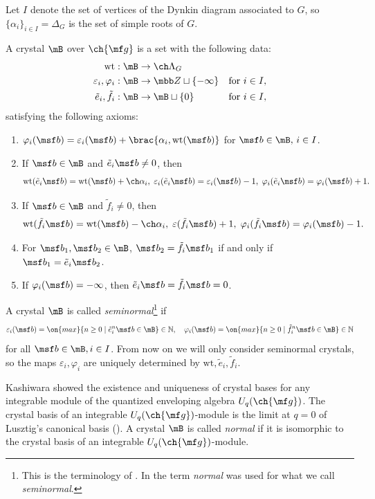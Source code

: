 Let $I$ denote the set of vertices of the Dynkin diagram associated to $G$,
so $\{\alpha_i\}_{i\in I} = \Delta_G$ is the set of simple roots of $G$.

A crystal $\mB$ over $\ch{\mf g}$ is a set with the following data:
\begin{align*}
\mathrm{wt} &: \mB \to \ch\Lambda_G \\
\varepsilon_i, \varphi_i &: \mB \to \mbb Z \sqcup \{ -\infty \} &\text{for } i\in I, \\
\tilde e_i, \tilde f_i &: \mB \to \mB \sqcup \{0\} &\text{for } i\in I,
\end{align*}
satisfying the following axioms:
\begin{enumerate}[label={(\arabic*)}]
\item $\varphi_i(\msf b) = \varepsilon_i(\msf b) + \brac{ \alpha_i, \mathrm{wt}(\msf b)}$
for $\msf b \in \mB,\, i\in I$.
\item If $\msf b \in \mB$ and $\tilde e_i \msf b \ne 0$, then
\[ \mathrm{wt}(\tilde e_i \msf b) = \mathrm{wt}(\msf b) + \ch\alpha_i,\;
\varepsilon_i( \tilde e_i \msf b) = \varepsilon_i(\msf b) -1,\;
\varphi_i( \tilde e_i \msf b) = \varphi_i( \msf b ) + 1. \]
\item If $\msf b \in \mB$ and $\tilde f_i \ne 0$, then
\[ \mathrm{wt}(\tilde f_i \msf b) = \mathrm{wt}(\msf b) - \ch\alpha_i,\;
\varepsilon(\tilde f_i \msf b) + 1,\;
\varphi_i(\tilde f_i \msf b) = \varphi_i(\msf b) -1.
\]
\item For $\msf b_1, \msf b_2 \in  \mB$, $\msf b_2 = \tilde f_i \msf b_1$ if and only if
$\msf b_1 = \tilde e_i \msf b_2$.
\item If $\varphi_i(\msf b)=-\infty$, then $\tilde e_i \msf b = \tilde f_i \msf b = 0$.
\end{enumerate}

A crystal $\mB$ is called \emph{seminormal}\footnote{This is the terminology of \cite{Kas94,Kas95}. In \cite{Kas93} the term \emph{normal} was used for what we call \emph{seminormal}.}
if
\[ \varepsilon_i(\msf b) = \on{max} \{ n \ge 0 \mid \tilde e_i^n \msf b \in \mB \} \in \mathbb N,
\quad \varphi_i(\msf b) = \on{max} \{ n \ge 0 \mid \tilde f_i^n \msf b \in \mB \} \in \mathbb N
\]
for all $\msf b\in \mB, i\in I$.
From now on we will only consider seminormal crystals, so the maps $\varepsilon_i, \varphi_i$
are uniquely determined by $\mathrm{wt}, \tilde e_i, \tilde f_i$.

Kashiwara showed the existence and uniqueness of crystal bases for any integrable module of the
quantized enveloping algebra $U_q(\ch{\mf g})$.
The crystal basis of an integrable $U_q(\ch{\mf g})$-module
is the limit at $q=0$ of Lusztig's canonical basis
(\cite{Lusztig90,Grojnowski-Lusztig}).
A crystal $\mB$ is called \emph{normal} if it is isomorphic to the crystal basis
of an integrable $U_q(\ch{\mf g})$-module.

